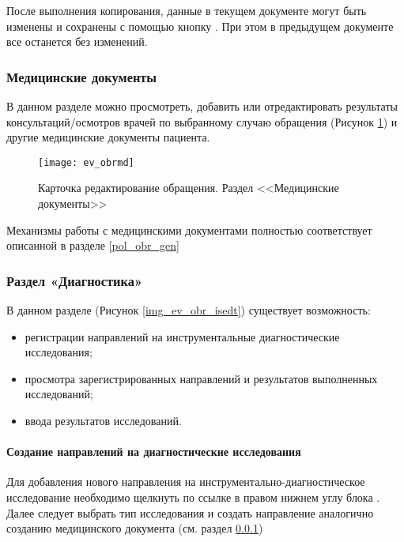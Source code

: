 {После выполнения копирования, данные в текущем документе могут быть изменены и сохранены с помощью кнопку . При этом в предыдущем документе все останется без изменений.


{
\subsubsection{Медицинские документы} \label{ev_obr_md}

В данном разделе можно просмотреть, добавить или отредактировать результаты консультаций\slash осмотров врачей по выбранному случаю обращения (Рисунок \ref{img_ev_obrmd}) и другие медицинские документы пациента.

\begin{figure}[ht]\centering
 \texttt{[image: ev\_obrmd]}
 \caption{Карточка редактирование обращения. Раздел <<Медицинские документы>>}
 \label{img_ev_obrmd}
\end{figure}
}{}

Механизмы работы с медицинскими документами полностью соответствует описанной в разделе \ref{pol_obr_gen}

\subsubsection{Раздел «Диагностика»} \label{ev_obr_is}

{
В данном разделе (Рисунок \ref{img_ev_obr_isedt}) существует возможность:
\begin{itemize}
 \item регистрации направлений на инструментальные диагностические исследования;
 \item просмотра зарегистрированных направлений и результатов выполненных исследований;
 \item ввода результатов исследований.
\end{itemize}
 
\paragraph{Создание направлений на диагностические исследования}

Для добавления нового направления на инструментально-диагностическое исследование необходимо щелкнуть по ссылке  в правом нижнем углу блока . Далее следует выбрать тип исследования и создать направление аналогично созданию медицинского документа (см. раздел \ref{ev_obr_md})

}}
